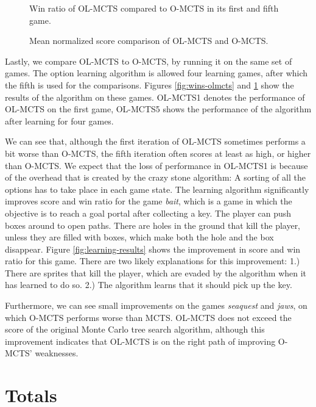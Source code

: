 \begin{figure}
	\centering
	\vspace{-.8cm}
	\caption{Win ratio of OL-MCTS compared to O-MCTS in its first and fifth game.}
	\label{fig:wins-olmcts}
	\centering
	\vspace{-.8cm}
	\caption{Mean normalized score comparison of OL-MCTS and O-MCTS.}
	\label{fig:scores-olmcts}
\end{figure}

Lastly, we compare OL-MCTS to O-MCTS, by running it on the same set of games.
The option learning algorithm is allowed four learning games, after which the
fifth is used for the comparisons. Figures \ref{fig:wins-olmcts} and
\ref{fig:scores-olmcts} show the results of the algorithm on these games.
OL-MCTS1 denotes the performance of OL-MCTS on the first game, OL-MCTS5 shows
the performance of the algorithm after learning for four games. 


We can see that, although the first iteration of OL-MCTS sometimes performs a
bit worse than O-MCTS, the fifth iteration often scores at least as high, or
higher than O-MCTS. We expect that the loss of performance in OL-MCTS1 is
because of the overhead that is created by the crazy stone algorithm: A sorting
of all the options has to take place in each game state. The learning algorithm
significantly improves score and win ratio for the game \textit{bait}, which is
a game in which the objective is to reach a goal portal after collecting a key.
The player can push boxes around to open paths. There are holes in the ground
that kill the player, unless they are filled with boxes, which make both the
hole and the box disappear. Figure \ref{fig:learning-results} shows the
improvement in score and win ratio for this game. There are two likely 
explanations for this improvement: 1.) There are sprites that kill the player,
which are evaded by the algorithm when it has learned to do so.  2.) The
algorithm learns that it should pick up the key.

Furthermore, we can see small improvements on the games \textit{seaquest} and
\textit{jaws}, on which O-MCTS performs worse than MCTS.  OL-MCTS does not
exceed the score of the original Monte Carlo tree search algorithm, although
this improvement indicates that OL-MCTS is on the right path of improving
O-MCTS' weaknesses.

\section{Totals}
\label{subsec:totals}

